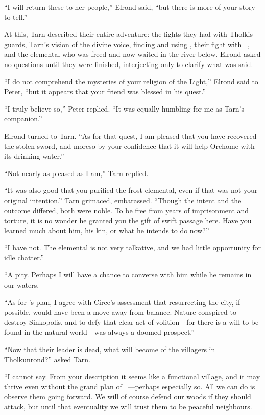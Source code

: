 ``I will return these to her people,'' Elrond said, ``but there is more of your story to tell.''

At this, Tarn described their entire adventure: the fights they had with Tholkis guards, Tarn's vision of the divine voice, finding and using \kildir, their fight with \mothzam\ \driktur, and the elemental who was freed and now waited in the river below.  Elrond asked no questions until they were finished, interjecting only to clarify what was said.

``I do not comprehend the mysteries of your religion of the Light,'' Elrond said to Peter, ``but it appears that your friend was blessed in his quest.''

``I truly believe so,'' Peter replied.  ``It was equally humbling for me as Tarn's companion.''

Elrond turned to Tarn.  ``As for that quest, I am pleased that you have recovered the stolen sword, and moreso by your confidence that it will help Orehome with its drinking water.''

``Not nearly as pleased as I am,'' Tarn replied.

``It was also good that you purified the frost elemental, even if that was not your original intention.''  Tarn grimaced, embarassed.  ``Though the intent and the outcome differed, both were noble.  To be free from years of imprisonment and torture, it is no wonder he granted you the gift of swift passage here.  Have you learned much about him, his kin, or what he intends to do now?''

``I have not.  The elemental is not very talkative, and we had little opportunity for idle chatter.''

``A pity.  Perhaps I will have a chance to converse with him while he remains in our waters.

``As for \mothzam's plan, I agree with Circe's assessment that resurrecting the city, if possible, would have been a move away from balance.  Nature conspired to destroy Sinkopolis, and to defy that clear act of volition---for there is a will to be found in the natural world---was always a doomed prospect.''

``Now that their leader is dead, what will become of the villagers in Tholkunrond?'' asked Tarn.

``I cannot say.  From your description it seems like a functional village, and it may thrive even without the grand plan of \mothzam\ \driktur---perhaps especially so.  All we can do is observe them going forward.  We will of course defend our woods if they should attack, but until that eventuality we will trust them to be peaceful neighbours.


